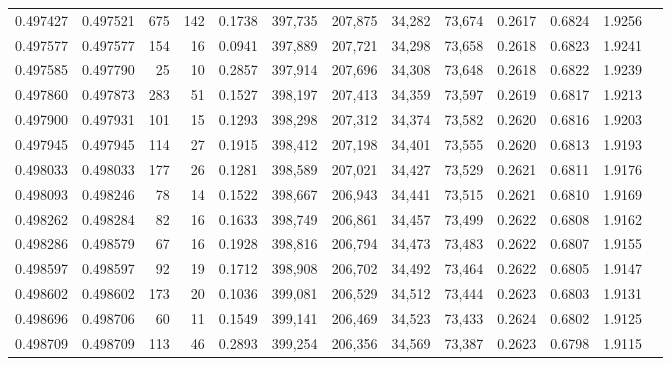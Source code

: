 \begin{tabular}{rrrrrrrrrrrrr}
0.497427 & 0.497521 &   675 &   142 &                                     0.1738 & 397,735 & 207,875 &  34,282 &  73,674 & 0.2617 & 0.6824 & 1.9256 \\
0.497577 & 0.497577 &   154 &    16 &                                     0.0941 & 397,889 & 207,721 &  34,298 &  73,658 & 0.2618 & 0.6823 & 1.9241 \\
0.497585 & 0.497790 &    25 &    10 &                                     0.2857 & 397,914 & 207,696 &  34,308 &  73,648 & 0.2618 & 0.6822 & 1.9239 \\
0.497860 & 0.497873 &   283 &    51 &                                     0.1527 & 398,197 & 207,413 &  34,359 &  73,597 & 0.2619 & 0.6817 & 1.9213 \\
0.497900 & 0.497931 &   101 &    15 &                                     0.1293 & 398,298 & 207,312 &  34,374 &  73,582 & 0.2620 & 0.6816 & 1.9203 \\
0.497945 & 0.497945 &   114 &    27 &                                     0.1915 & 398,412 & 207,198 &  34,401 &  73,555 & 0.2620 & 0.6813 & 1.9193 \\
0.498033 & 0.498033 &   177 &    26 &                                     0.1281 & 398,589 & 207,021 &  34,427 &  73,529 & 0.2621 & 0.6811 & 1.9176 \\
0.498093 & 0.498246 &    78 &    14 &                                     0.1522 & 398,667 & 206,943 &  34,441 &  73,515 & 0.2621 & 0.6810 & 1.9169 \\
0.498262 & 0.498284 &    82 &    16 &                                     0.1633 & 398,749 & 206,861 &  34,457 &  73,499 & 0.2622 & 0.6808 & 1.9162 \\
0.498286 & 0.498579 &    67 &    16 &                                     0.1928 & 398,816 & 206,794 &  34,473 &  73,483 & 0.2622 & 0.6807 & 1.9155 \\
0.498597 & 0.498597 &    92 &    19 &                                     0.1712 & 398,908 & 206,702 &  34,492 &  73,464 & 0.2622 & 0.6805 & 1.9147 \\
0.498602 & 0.498602 &   173 &    20 &                                     0.1036 & 399,081 & 206,529 &  34,512 &  73,444 & 0.2623 & 0.6803 & 1.9131 \\
0.498696 & 0.498706 &    60 &    11 &                                     0.1549 & 399,141 & 206,469 &  34,523 &  73,433 & 0.2624 & 0.6802 & 1.9125 \\
0.498709 & 0.498709 &   113 &    46 &                                     0.2893 & 399,254 & 206,356 &  34,569 &  73,387 & 0.2623 & 0.6798 & 1.9115 \\

\end{tabular}

